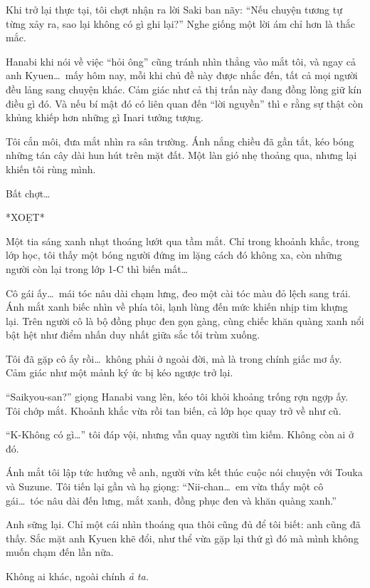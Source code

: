 \documentclass[../main.tex]{subfiles}
\begin{document}
Khi trở lại thực tại, tôi chợt nhận ra lời Saki ban nãy: ``Nếu chuyện tương tự từng xảy ra, sao lại không có gì ghi lại?'' Nghe giống một lời ám chỉ hơn là thắc mắc.

Hanabi khi nói về việc ``hỏi ông'' cũng tránh nhìn thẳng vào mắt tôi, và ngay cả anh Kyuen\dots\ mấy hôm nay, mỗi khi chủ đề này được nhắc đến, tất cả mọi người đều lảng sang chuyện khác. Cảm giác như cả thị trấn này đang đồng lòng giữ kín điều gì đó. Và nếu bí mật đó có liên quan đến ``lời nguyền'' thì e rằng sự thật còn khủng khiếp hơn những gì Inari tưởng tượng.

Tôi cắn môi, đưa mắt nhìn ra sân trường. Ánh nắng chiều đã gần tắt, kéo bóng những tán cây dài hun hút trên mặt đất. Một làn gió nhẹ thoảng qua, nhưng lại khiến tôi rùng mình.

Bất chợt\dots

*XOẸT*

Một tia sáng xanh nhạt thoáng lướt qua tầm mắt. Chỉ trong khoảnh khắc, trong lớp học, tôi thấy một bóng người đứng im lặng cách đó không xa, còn những người còn lại trong lớp 1-C thì biến mất\dots


Cô gái ấy\dots\ mái tóc nâu dài chạm lưng, đeo một cài tóc màu đỏ lệch sang trái. Ánh mắt xanh biếc nhìn về phía tôi, lạnh lùng đến mức khiến nhịp tim khựng lại. Trên người cô là bộ đồng phục đen gọn gàng, cùng chiếc khăn quàng xanh nổi bật hệt như điểm nhấn duy nhất giữa sắc tối trùm xuống.

Tôi đã gặp cô ấy rồi\dots\ không phải ở ngoài đời, mà là trong chính giấc mơ ấy. Cảm giác như một mảnh ký ức bị kéo ngược trở lại.

``Saikyou-san?'' giọng Hanabi vang lên, kéo tôi khỏi khoảng trống rợn ngợp ấy. Tôi chớp mắt. Khoảnh khắc vừa rồi tan biến, cả lớp học quay trở về như cũ.

``K-Không có gì\dots'' tôi đáp vội, nhưng vẫn quay người tìm kiếm. Không còn ai ở đó.

Ánh mắt tôi lập tức hướng về anh, người vừa kết thúc cuộc nói chuyện với Touka và Suzune. Tôi tiến lại gần và hạ giọng: ``Nii-chan\dots\ em vừa thấy một cô gái\dots\ tóc nâu dài đến lưng, mắt xanh, đồng phục đen và khăn quàng xanh.''

Anh sững lại. Chỉ một cái nhìn thoáng qua thôi cũng đủ để tôi biết: anh cũng đã thấy. Sắc mặt anh Kyuen khẽ đổi, như thể vừa gặp lại thứ gì đó mà mình không muốn chạm đến lần nữa.

Không ai khác, ngoài chính \emph{ả ta.}
\end{document}
